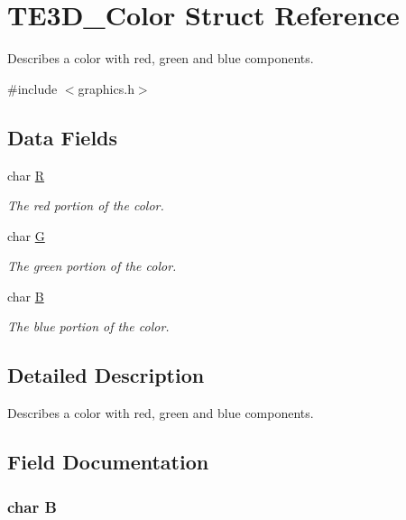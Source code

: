 \hypertarget{struct_t_e3_d___color}{\section{T\-E3\-D\-\_\-\-Color Struct Reference}
\label{struct_t_e3_d___color}
}


Describes a color with red, green and blue components.  




{\ttfamily \#include $<$graphics.\-h$>$}

\subsection*{Data Fields}
\begin{DoxyCompactItemize}
\item 
char \hyperlink{struct_t_e3_d___color_a4357ae277476a29fe6f60cfd3ccd798f}{R}
\begin{DoxyCompactList}\small\item\em The red portion of the color. \end{DoxyCompactList}\item 
char \hyperlink{struct_t_e3_d___color_a315a930253c84503674d7296f5868b9a}{G}
\begin{DoxyCompactList}\small\item\em The green portion of the color. \end{DoxyCompactList}\item 
char \hyperlink{struct_t_e3_d___color_a0c2e9c326e4fa45c92abddf771972f64}{B}
\begin{DoxyCompactList}\small\item\em The blue portion of the color. \end{DoxyCompactList}\end{DoxyCompactItemize}


\subsection{Detailed Description}
Describes a color with red, green and blue components. 

\subsection{Field Documentation}
\hypertarget{struct_t_e3_d___color_a0c2e9c326e4fa45c92abddf771972f64}{
\subsubsection[{B}]{\setlength{\rightskip}{0pt plus 5cm}char B}}\label{struct_t_e3_d___color_a0c2e9c326e4fa45c92abddf771972f64}


